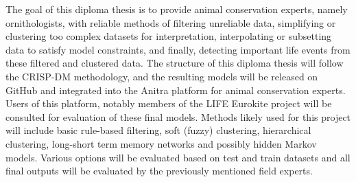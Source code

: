 The goal of this diploma thesis is to provide animal conservation experts, namely ornithologists, with reliable methods of filtering unreliable data, simplifying or clustering too complex datasets for interpretation, interpolating or subsetting data to satisfy model constraints, and finally, detecting important life events from these filtered and clustered data. The structure of this diploma thesis will follow the CRISP-DM methodology, and the resulting models will be released on GitHub and integrated into the Anitra platform for animal conservation experts. Users of this platform, notably members of the LIFE Eurokite project will be consulted for evaluation of these final models. Methods likely used for this project will include basic rule-based filtering, soft (fuzzy) clustering, hierarchical clustering, long-short term memory networks and possibly hidden Markov models. Various options will be evaluated based on test and train datasets and all final outputs will be evaluated by the previously mentioned field experts.
